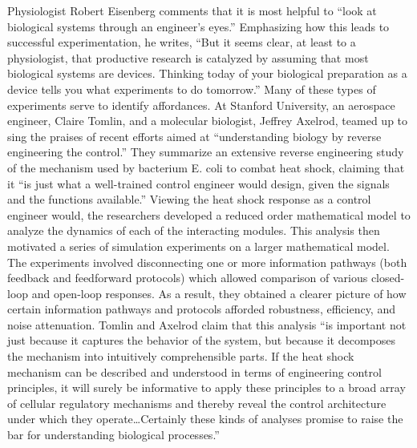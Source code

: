 Physiologist Robert Eisenberg comments that it is most helpful to “look
at biological systems through an engineer’s eyes.”\citep[][pg. 376]{eisenberg2007}
Emphasizing how this leads to successful experimentation, he writes,
“But it seems clear, at least to a physiologist, that productive
research is catalyzed by assuming that most biological systems are
devices. Thinking today of your biological preparation as a device
tells you what experiments to do tomorrow.” Many of these types of
experiments serve to identify affordances. At Stanford University, an
aerospace engineer, Claire Tomlin, and a molecular biologist, Jeffrey
Axelrod, teamed up to sing the praises of recent efforts aimed at
``understanding biology by reverse engineering the
control.''\citep[][pgs. 4219--4220]{tomlinaxelrod2005} They summarize an extensive reverse
engineering study of the mechanism used by bacterium E. coli to combat
heat shock,\citep{elsamadetal2005} claiming that it “is just what a
well-trained control engineer would design, given the signals and the
functions available.” Viewing the heat shock response as a control
engineer would, the researchers developed a reduced order mathematical
model to analyze the dynamics of each of the interacting modules. This
analysis then motivated a series of simulation experiments on a larger
mathematical model. The experiments involved disconnecting one or more
information pathways (both feedback and feedforward protocols) which
allowed comparison of various closed-loop and open-loop responses. As a
result, they obtained a clearer picture of how certain information
pathways and protocols afforded robustness, efficiency, and noise
attenuation. Tomlin and Axelrod claim that this analysis “is important
not just because it captures the behavior of the system, but because it
decomposes the mechanism into intuitively comprehensible parts. If the
heat shock mechanism can be described and understood in terms of
engineering control principles, it will surely be informative to apply
these principles to a broad array of cellular regulatory mechanisms and
thereby reveal the control architecture under which they
operate{\ldots}Certainly these kinds of analyses promise to raise the bar for
understanding biological processes.”

